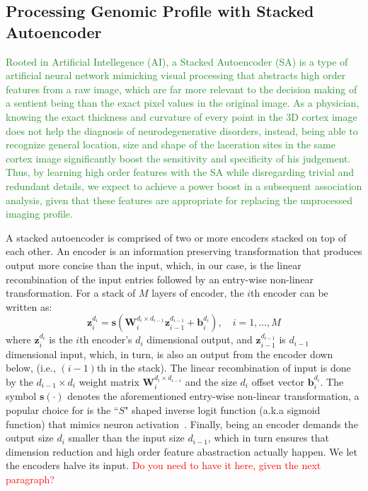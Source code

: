 \documentclass[11pt]{article}
\newcommand{\xacc}[1]{\textcolor{ForestGreen}{#1}}
\newcommand{\vecEC}[1]{\boldsymbol{#1}}
\newcommand{\WEC}{\vecEC{W}}                   %
\newcommand{\WEI}[3]{\WEC_{#1}^{d_{#2} \times d_{#3}}} %
\newcommand{\bEC}{\vecEC{b}}    %
\newcommand{\bEI}[2]{\bEC_{#1}^{d_{#2}}} %
\newcommand{\zEC}{\vecEC{z}}
\newcommand{\zEI}[2]{\zEC_{#1}^{d_{#2}}}
\begin{document}
\subsection*{Processing Genomic Profile with Stacked Autoencoder}
\xacc{Rooted in Artificial Intellegence (AI), a Stacked Autoencoder (SA) is a type of artificial neural network mimicking visual processing that abstracts high order features from a raw image, which are far more relevant to the decision making of a sentient being than the exact pixel values in the original image. As a physician, knowing the exact thickness and curvature of every point in the 3D cortex image does not help the diagnosis of neurodegenerative disorders, instead, being able to recognize general location, size and shape of the laceration sites in the same cortex image significantly boost the sensitivity and specificity of his judgement. Thus, by learning high order features with the SA while disregarding trivial and redundant details, we expect to achieve a power boost in a subsequent association analysis, given that these features are appropriate for replacing the unprocessed imaging profile.}

A stacked autoencoder is comprised of two or more encoders stacked on top of each other. An encoder is an information preserving transformation that produces output more concise than the input, which, in our case, is the linear recombination of the input entries followed by an entry-wise non-linear transformation. For a stack of $M$ layers of encoder, the $i$th encoder can be written as:
\begin{equation} \label{eq:AE}
  \zEC_i^{d_i} = \boldsymbol{s}(\WEI{i}{i}{i-1} \zEI{i-1}{i-1} + \bEI{i}{i}), \quad i = 1, \ldots, M
\end{equation}
where $\zEI{i}{i}$ is the $i$th encoder's $d_i$ dimensional output, and $\zEI{i-1}{i-1}$ is $d_{i-1}$ dimensional input, which, in turn, is also an output from the encoder down below, (i.e., $(i-1)$th in the stack). The linear recombination of input is done by the $d_{i-1} \times d_i$ weight matrix $\WEI{i}{i}{i-i}$ and the size $d_i$ offset vector $\bEI{i}{i}$. The symbol $\boldsymbol{s}(\cdot)$ denotes the aforementioned entry-wise non-linear transformation, a popular choice for is the ``$S$" shaped inverse logit function (a.k.a sigmoid function) that mimics neuron activation~\cite{SGM1, NNE90}. Finally, being an encoder demands the output size $d_i$ smaller than the input size $d_{i-1}$, which in turn ensures that dimension reduction and high order feature abastraction actually happen. We let the encoders halve its input. \textcolor{red}{Do you need to have it here, given the next paragraph?}
\end{document}
